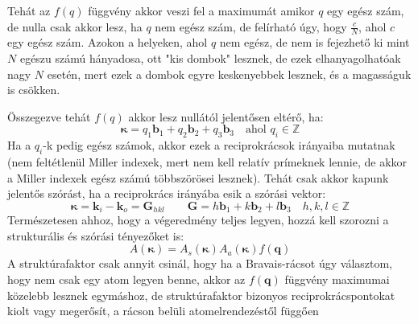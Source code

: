 \documentclass[../main.tex]{subfiles}
\begin{document}
Tehát az $f(q)$ függvény akkor veszi fel a maximumát amikor $q$ egy egész szám, de nulla csak akkor lesz, ha $q$ nem egész szám, de felírható úgy, hogy $\frac{c}{N}$, ahol $c$ egy egész szám.
Azokon a helyeken, ahol $q$ nem egész, de nem is fejezhető ki mint $N$ egészu számú hányadosa, ott "kis dombok" lesznek, de ezek elhanyagolhatóak nagy $N$ esetén, mert ezek a dombok egyre keskenyebbek lesznek, és a magasságuk is csökken.

Összegezve tehát $f(q)$ akkor lesz nullától jelentősen eltérő, ha:
\begin{equation}
    \boldsymbol{\kappa} = q_1 \mathbf{b}_1 + q_2 \mathbf{b}_2 + q_3 \mathbf{b}_3 \quad \text{ahol } q_i \in \mathbb{Z}
\end{equation}
Ha a $q_i$-k pedig egész számok, akkor ezek a reciprokrácsok irányaiba mutatnak (nem feltétlenül Miller indexek, mert nem kell relatív prímeknek lennie, de akkor a Miller indexek egész számú többszörösei lesznek).
Tehát csak akkor kapunk jelentős szórást, ha a reciprokrács irányába esik a szórási vektor:
\begin{equation}
    \boxed{\boldsymbol{\kappa} = \mathbf{k}_i - \mathbf{k}_o = \mathbf{G}_{hkl}} \qquad \mathbf{G} = h \mathbf{b}_1 + k \mathbf{b}_2 + l \mathbf{b}_3 \quad h,k,l \in \mathbb{Z}
\end{equation}
Természetesen ahhoz, hogy a végeredmény teljes legyen, hozzá kell szorozni a strukturális és szórási tényezőket is:
\begin{equation}
    A(\boldsymbol{\kappa}) = A_s(\boldsymbol{\kappa}) A_a(\boldsymbol{\kappa}) f(\mathbf{q})
\end{equation}
A struktúrafaktor csak annyit csinál, hogy ha a Bravais-rácsot úgy választom, hogy nem csak egy atom legyen benne, akkor az $f(\mathbf{q})$ függvény maximumai közelebb lesznek egymáshoz, de struktúrafaktor bizonyos reciprokrácspontokat kiolt vagy megerősít, a rácson belüli atomelrendezéstől függően
\end{document}
